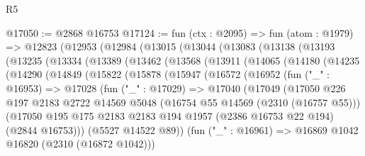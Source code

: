 \begin{lexlean}{R5}
\begin{coremodule}
@17050 := @2868 @16753
@17124 := fun (ctx : @2095) =>
  fun (atom : @1979) =>
  @12823
    (@12953
      (@12984
        (@13015
          (@13044
            (@13083
              (@13138
                (@13193
                  (@13235
                    (@13334
                      (@13389
                        (@13462
                          (@13568
                            (@13911
                              (@14065
                                (@14180
                                  (@14235
                                    (@14290
                                      (@14849
                                        (@15822
                                          (@15878
                                            (@15947
                                              (@16572
                                                (@16952
                                                  (fun ("_" : @16953) =>
                                                  @17028
                                                    (fun ("_" : @17029) =>
                                                    @17040
                                                      (@17049
                                                        (@17050
                                                          @226
                                                          @197
                                                          @2183
                                                          @2722
                                                          @14569
                                                          @5048
                                                          (@16754 @55 @14569 (@2310 (@16757 @55)))
                                                          (@17050
                                                            @195
                                                            @175
                                                            @2183
                                                            @2183
                                                            @194
                                                            @1957
                                                            (@2386 @16753 @22 @194)
                                                            (@2844 @16753)))
                                                        (@5527 @14522 @89))
                                                      (fun ("_" : @16961) =>
                                                      @16869 @1042 @16820 (@2310 (@16872 @1042)))

\end{coremodule}
\end{lexlean}
